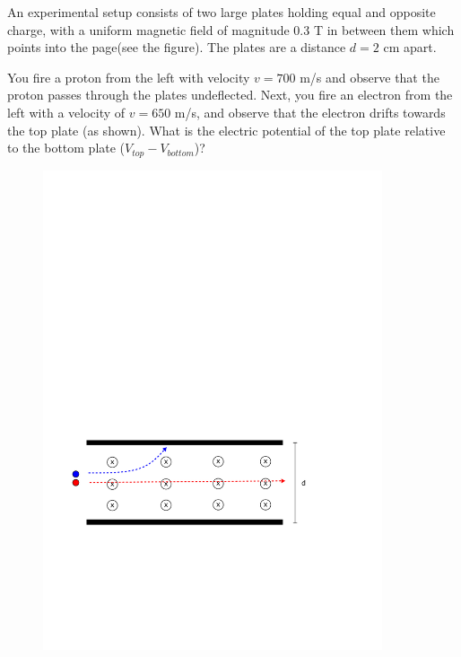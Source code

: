 \question An experimental setup consists of two large plates holding equal and opposite charge, with a uniform magnetic field of magnitude 0.3 T in between them which points into the page(see the figure). The plates are a distance $d=2$ cm apart.

 You fire a proton from the left with velocity $v=700$ m/s and observe that the proton passes through the plates undeflected. Next, you fire an electron from the left with a velocity of $v=650$ m/s, and observe that the electron drifts towards the top plate (as shown). What is the electric potential of the top plate relative to the bottom plate ($V_{top}-V_{bottom}$)?
\begin{figure}[ht!]
	\centering
	\includegraphics[width=10cm]{lorentz}
\end{figure}